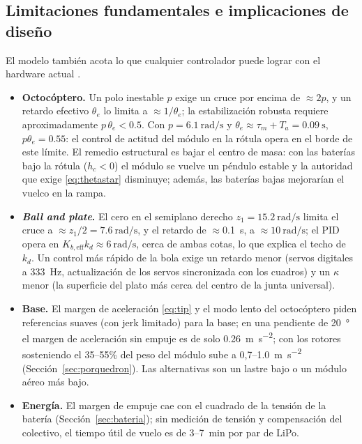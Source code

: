 \subsection{Limitaciones fundamentales e implicaciones de diseño}
\label{sec:limits_fund}
El modelo también acota lo que cualquier controlador puede lograr con el hardware actual \cite{skogestad2005}.
\begin{itemize}
  \item \textbf{Octocóptero.} Un polo inestable $p$ exige un cruce por encima de $\approx2p$, y un retardo efectivo $\theta_e$ lo limita a $\approx1/\theta_e$; la estabilización robusta requiere aproximadamente $p\,\theta_e<0.5$. Con $p=\SI{6.1}{\radian\per\second}$ y $\theta_e\approx\tau_m+T_a=\SI{0.09}{\second}$, $p\theta_e=0.55$: el control de actitud del módulo en la rótula opera en el borde de este límite. El remedio estructural es bajar el centro de masa: con las baterías bajo la rótula ($h_c<0$) el módulo se vuelve un péndulo estable y la autoridad que exige \eqref{eq:thetastar} disminuye; además, las baterías bajas mejorarían el vuelco en la rampa.
  \item \textbf{\textit{Ball and plate}.} El cero en el semiplano derecho $z_1=\SI{15.2}{\radian\per\second}$ limita el cruce a $\approx z_1/2=\SI{7.6}{\radian\per\second}$, y el retardo de $\approx$\SI{0.1}{\second}, a $\approx\SI{10}{\radian\per\second}$; el PID opera en $K_{b,\mathrm{eff}}k_d\approx\SI{6}{\radian\per\second}$, cerca de ambas cotas, lo que explica el techo de $k_d$. Un control más rápido de la bola exige un retardo menor (servos digitales a \SI{333}{\hertz}, actualización de los servos sincronizada con los cuadros) y un $\kappa$ menor (la superficie del plato más cerca del centro de la junta universal).
  \item \textbf{Base.} El margen de aceleración \eqref{eq:tip} y el modo lento del octocóptero piden referencias suaves (con jerk limitado) para la base; en una pendiente de \SI{20}{\degree} el margen de aceleración sin empuje es de solo \SI{0.26}{\metre\per\second\squared}; con los rotores sosteniendo el 35--55\% del peso del módulo sube a 0,7--\SI{1.0}{\metre\per\second\squared} (Sección~\ref{sec:porquedron}). Las alternativas son un lastre bajo o un módulo aéreo más bajo.
  \item \textbf{Energía.} El margen de empuje cae con el cuadrado de la tensión de la batería (Sección~\ref{sec:bateria}); sin medición de tensión y compensación del colectivo, el tiempo útil de vuelo es de 3--\SI{7}{\minute} por par de LiPo.
\end{itemize}
